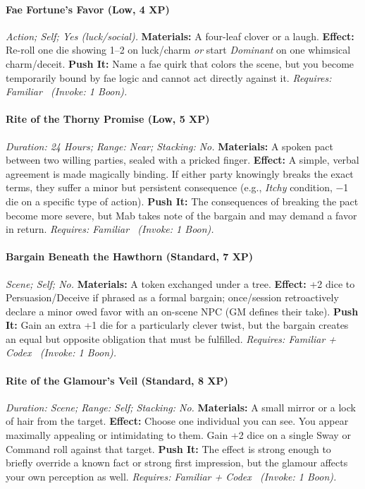 \paragraph{Fae Fortune's Favor (Low, 4 XP)} \emph{Action; Self; Yes (luck/social).}
\textbf{Materials:} A four-leaf clover or a laugh.
\textbf{Effect:} Re-roll one die showing 1--2 on luck/charm \emph{or} start \emph{Dominant} on one whimsical charm/deceit.
\textbf{Push It:} Name a fae quirk that colors the scene, but you become temporarily bound by fae logic and cannot act directly against it.
\emph{Requires: Familiar \ (\textit{Invoke:} 1 Boon).}
\paragraph{Rite of the Thorny Promise (Low, 5 XP)} \emph{Duration: 24 Hours; Range: Near; Stacking: No.}
\textbf{Materials:} A spoken pact between two willing parties, sealed with a pricked finger.
\textbf{Effect:} A simple, verbal agreement is made magically binding. If either party knowingly breaks the exact terms, they suffer a minor but persistent consequence (e.g., \emph{Itchy} condition, −1 die on a specific type of action).
\textbf{Push It:} The consequences of breaking the pact become more severe, but Mab takes note of the bargain and may demand a favor in return.
\emph{Requires: Familiar \ (\textit{Invoke:} 1 Boon).}
\paragraph{Bargain Beneath the Hawthorn (Standard, 7 XP)} \emph{Scene; Self; No.}
\textbf{Materials:} A token exchanged under a tree.
\textbf{Effect:} +2 dice to Persuasion/Deceive if phrased as a formal bargain; once/session retroactively declare a minor owed favor with an on-scene NPC (GM defines their take).
\textbf{Push It:} Gain an extra +1 die for a particularly clever twist, but the bargain creates an equal but opposite obligation that must be fulfilled.
\emph{Requires: Familiar + Codex \ (\textit{Invoke:} 1 Boon).}
\paragraph{Rite of the Glamour's Veil (Standard, 8 XP)} \emph{Duration: Scene; Range: Self; Stacking: No.}
\textbf{Materials:} A small mirror or a lock of hair from the target.
\textbf{Effect:} Choose one individual you can see. You appear maximally appealing or intimidating to them. Gain +2 dice on a single Sway or Command roll against that target.
\textbf{Push It:} The effect is strong enough to briefly override a known fact or strong first impression, but the glamour affects your own perception as well.
\emph{Requires: Familiar + Codex \ (\textit{Invoke:} 1 Boon).}
